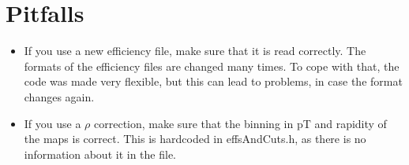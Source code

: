 \documentclass{article}
\begin{document}
\section{Pitfalls}

\begin{itemize}
\item If you use a new efficiency file, make sure that it is read correctly. The formats of the efficiency files are changed many times. To cope with that, the code was made very flexible, but this can lead to problems, in case the format changes again.
\item If you use a $\rho$ correction, make sure that the binning in pT and rapidity of the maps is correct. This is hardcoded in effsAndCuts.h, as there is no information about it in the file. 
\end{itemize}
\end{document}
